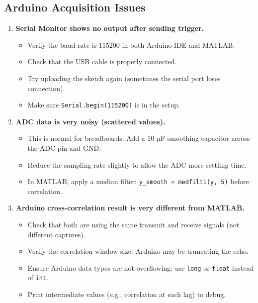 \documentclass[11pt,letterpaper]{article}
\begin{document}
\subsection*{Arduino Acquisition Issues}

\begin{enumerate}
    \item \textbf{Serial Monitor shows no output after sending trigger.}
    \begin{itemize}
        \item Verify the baud rate is 115200 in both Arduino IDE and MATLAB.
        \item Check that the USB cable is properly connected.
        \item Try uploading the sketch again (sometimes the serial port loses connection).
        \item Make sure \texttt{Serial.begin(115200)} is in the setup.
    \end{itemize}

    \item \textbf{ADC data is very noisy (scattered values).}
    \begin{itemize}
        \item This is normal for breadboards. Add a 10 µF smoothing capacitor across the ADC pin and GND.
        \item Reduce the sampling rate slightly to allow the ADC more settling time.
        \item In MATLAB, apply a median filter: \texttt{y\_smooth = medfilt1(y, 5)} before correlation.
    \end{itemize}

    \item \textbf{Arduino cross-correlation result is very different from MATLAB.}
    \begin{itemize}
        \item Check that both are using the same transmit and receive signals (not different captures).
        \item Verify the correlation window size: Arduino may be truncating the echo.
        \item Ensure Arduino data types are not overflowing: use \texttt{long} or \texttt{float} instead of \texttt{int}.
        \item Print intermediate values (e.g., correlation at each lag) to debug.
    \end{itemize}
\end{enumerate}
\end{document}
